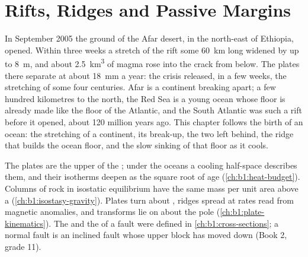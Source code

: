 \chapter{Rifts, Ridges and Passive Margins}\label{ch:b1:rifts-ridges-margins}

In September 2005 the ground of the Afar desert, in the north-east of Ethiopia,
opened. Within three weeks a stretch of the rift some \qty{60}{km} long widened by up
to \qty{8}{m}, and about \qty{2.5}{km^3} of magma rose into the crack from
below. The plates there separate at about \qty{18}{mm} a year: the crisis
released, in a few weeks, the stretching of some four centuries. Afar is a
continent breaking apart; a few hundred kilometres to the north, the Red Sea
is a young ocean whose floor is already made like the floor of the Atlantic,
and the South Atlantic was such a rift before it opened, about 120 million
years ago. This chapter follows the birth of an ocean: the stretching of a
continent, its break-up, the two  left behind, the ridge that
builds the ocean floor, and the slow sinking of that floor as it cools.

\begin{recall}
The plates are the upper  of the ; under the
oceans a cooling half-space describes them, and their isotherms deepen as the
square root of age (\cref{ch:b1:heat-budget}). Columns of rock in isostatic
equilibrium have the same mass per unit area above a 
(\cref{ch:b1:isostasy-gravity}). Plates turn about , ridges spread
at rates read from magnetic anomalies, and transforms lie on 
about the pole (\cref{ch:b1:plate-kinematics}). The  and the  of a
fault were defined in \cref{ch:b1:cross-sections}; a normal fault is an
inclined fault whose upper block has moved down (Book 2, grade 11).
\end{recall}

